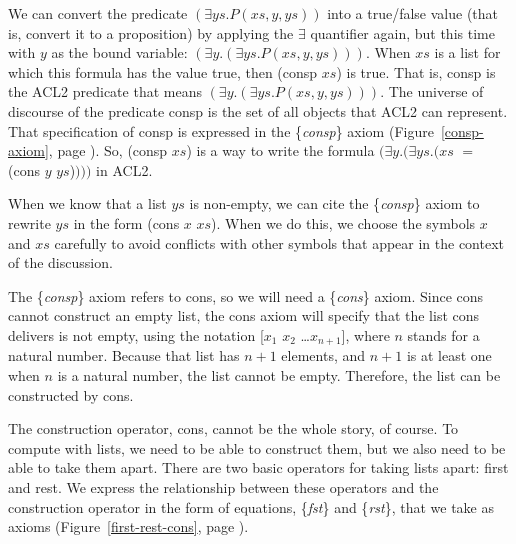 We can convert the predicate $(\exists ys.P(xs, y, ys))$
into a true/false value (that is, convert it to a proposition)
by applying the $\exists$ quantifier again,
but this time with $y$ as the bound variable:
$(\exists y.(\exists ys.P(xs, y, ys)))$.
When $xs$ is a list for which this formula has the value true,
then \textsf{(consp $xs$)} is true.
That is, \textsf{consp} is the ACL2 predicate that means $(\exists y.(\exists ys.P(xs, y, ys)))$.
The universe of discourse of the predicate \textsf{consp} 
is the set of all objects that ACL2 can represent.
That specification of \textsf{consp} is expressed in the \{\emph{consp}\} axiom
(Figure~\ref{consp-axiom}, page \pageref{consp-axiom}).
So, \textsf{(consp $xs$)} is a way to write the formula
$(\exists y.(\exists ys.(xs$ $=$ \textsf{(cons $y$ $ys$)}$)))$ in ACL2.

When we know that a list $ys$ is non-empty,
we can cite the \{\emph{consp}\} axiom
to rewrite $ys$ in the form \textsf{(cons $x$ $xs$)}.
When we do this, we choose the symbols $x$ and $xs$ carefully
to avoid conflicts with other symbols that appear in the context of the discussion.

The \{\emph{consp}\} axiom refers to \textsf{cons},
so we will need a \{\emph{cons}\} axiom.
Since \textsf{cons} cannot construct an empty list,
the cons axiom will specify that the list \textsf{cons} delivers is not empty,
using the notation \textsf{[$x_1$ $x_2$ \dots $x_{n+1}$]},
where $n$ stands for a natural number.
Because that list has $n+1$ elements, and $n+1$
is at least one when $n$ is a natural number,
the list cannot be empty.
Therefore, the list can be constructed by \textsf{cons}.

The construction operator, \textsf{cons}, cannot be the whole story, of course.
To compute with lists, we  need to be able to construct them,
but we also need to be able to take them apart.
There are two basic operators for taking lists apart: \textsf{first} and \textsf{rest}.
We express the relationship between these operators and
the construction operator in the form of equations,
\{\emph{fst}\} and \{\emph{rst}\}, that we take as axioms
(Figure~\ref{first-rest-cons}, page \pageref{first-rest-cons}).

